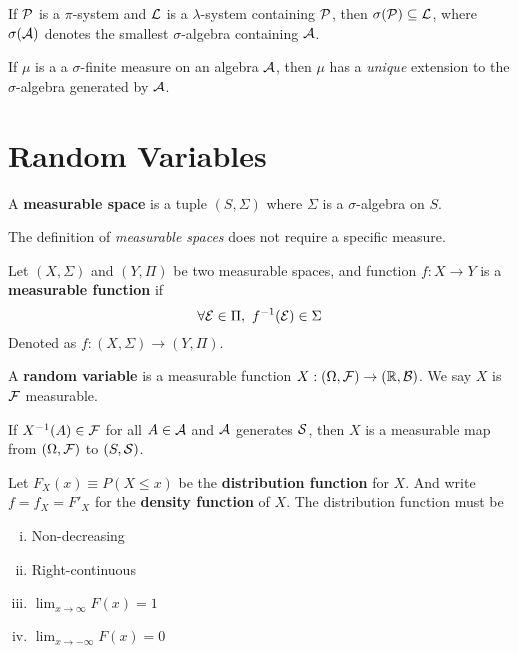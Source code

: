 \documentclass[11pt]{article}
\begin{document}
		\begin{theorem}
			If $\mathcal{{P}}$ is a $\pi$-system and $\mathcal{{L}}$ is a $\lambda$-system containing $\mathcal{{P}}$, then $\sigma(\mathcal{{P}}) \subseteq \mathcal{{L}}$, where $\sigma(\mathcal{{A}})$ denotes the smallest $\sigma$-algebra containing $\mathcal{{A}}$.
		\end{theorem}
		
		\begin{theorem}
			If $\mu$ is a a $\sigma$-finite measure on an algebra $\mathcal{{A}}$, then $\mu$ has a \emph{unique} extension to the $\sigma$-algebra generated by $\mathcal{{A}}$.
		\end{theorem}
	
	\section{Random Variables}
		\begin{definition}
			A \textbf{measurable space} is a tuple $(S, \Sigma)$ where $\Sigma$ is a $\sigma$-algebra on $S$.
		\end{definition}
		
		\begin{remark}
			The definition of \emph{measurable spaces} does not require a specific measure.
		\end{remark}
		
		\begin{definition}
			Let $(X, \Sigma)$ and $(Y, \Pi)$ be two measurable spaces, and function $f: X \to Y$ is a \textbf{measurable function} if 
			\[
				\forall \mathcal{{E}} \in \Pi,\ f^{-1}(\mathcal{{E}}) \in \Sigma
			\]
			Denoted as $f: (X, \Sigma) \to (Y, \Pi)$.
		\end{definition}
		
		\begin{definition}
			A \textbf{random variable} is a measurable function $X: (\Omega, \mathcal{{F}}) \to (\mathbb{R}, \mathcal{{B}})$. We say $X$ is $\mathcal{{F}}$ measurable.
		\end{definition}
		
		\begin{theorem}
			If $X^{-1}(A) \in \mathcal{{F}}$ for all $A \in \mathcal{{A}}$ and $\mathcal{{A}}$ generates $\mathcal{{S}}$, then $X$ is a measurable map from $(\Omega, \mathcal{{F}})$ to $(S, \mathcal{{S}})$.
		\end{theorem}
		
		\begin{definition}
			Let $F_X(x) \equiv P(X \leq x)$ be the \textbf{distribution function} for $X$. And write $f = f_X = F'_X$ for the \textbf{density function} of $X$. The distribution function must be
			\begin{enumerate}[(i)]
				\item Non-decreasing
				\item Right-continuous
				\item $\lim_{x\to \infty} F(x) = 1$
				\item $\lim_{x \to - \infty} F(x) = 0$
			\end{enumerate}
		\end{definition}
\end{document}
